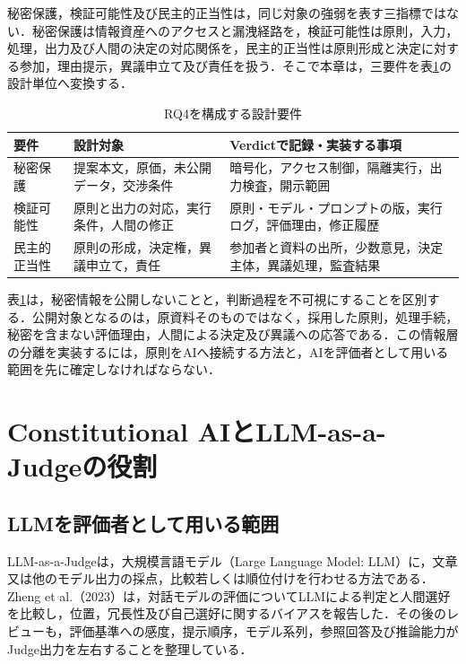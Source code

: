 秘密保護，検証可能性及び民主的正当性は，同じ対象の強弱を表す三指標ではない．秘密保護は情報資産へのアクセスと漏洩経路を，検証可能性は原則，入力，処理，出力及び人間の決定の対応関係を，民主的正当性は原則形成と決定に対する参加，理由提示，異議申立て及び責任を扱う．そこで本章は，三要件を表\ref{tab:ch7_design_requirements}の設計単位へ変換する．

\begin{table}[htb]
\caption{RQ4を構成する設計要件}
\label{tab:ch7_design_requirements}
\centering
\small
\begin{tabularx}{\columnwidth}{p{}p{}X}
\toprule
要件 & 設計対象 & Verdictで記録・実装する事項 \\
\midrule
秘密保護 & 提案本文，原価，未公開データ，交渉条件 & 暗号化，アクセス制御，隔離実行，出力検査，開示範囲 \\
検証可能性 & 原則と出力の対応，実行条件，人間の修正 & 原則・モデル・プロンプトの版，実行ログ，評価理由，修正履歴 \\
民主的正当性 & 原則の形成，決定権，異議申立て，責任 & 参加者と資料の出所，少数意見，決定主体，異議処理，監査結果 \\
\bottomrule
\end{tabularx}
\end{table}

表\ref{tab:ch7_design_requirements}は，秘密情報を公開しないことと，判断過程を不可視にすることを区別する．公開対象となるのは，原資料そのものではなく，採用した原則，処理手続，秘密を含まない評価理由，人間による決定及び異議への応答である．この情報層の分離を実装するには，原則をAIへ接続する方法と，AIを評価者として用いる範囲を先に確定しなければならない．

\section{Constitutional AIとLLM-as-a-Judgeの役割}

\subsection{LLMを評価者として用いる範囲}

LLM-as-a-Judgeは，大規模言語モデル（Large Language Model: LLM）に，文章又は他のモデル出力の採点，比較若しくは順位付けを行わせる方法である．Zheng et al.（2023）は，対話モデルの評価についてLLMによる判定と人間選好を比較し，位置，冗長性及び自己選好に関するバイアスを報告した\cite{zheng2023judging}．その後のレビューも，評価基準への感度，提示順序，モデル系列，参照回答及び推論能力がJudge出力を左右することを整理している\cite{gu2024llmjudge,li2024llmsjudges}．


